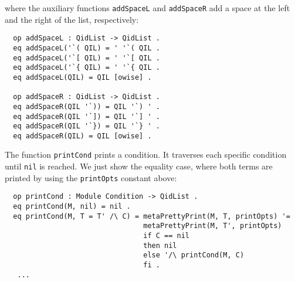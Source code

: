 \noindent
where the auxiliary functions \verb"addSpaceL" and \verb"addSpaceR"
add a space at the left and the right of the list, respectively:

{\codesize
\begin{verbatim}
  op addSpaceL : QidList -> QidList .
  eq addSpaceL('`( QIL) = ' '`( QIL .
  eq addSpaceL('`[ QIL) = ' '`[ QIL .
  eq addSpaceL('`{ QIL) = ' '`{ QIL .
  eq addSpaceL(QIL) = QIL [owise] .

  op addSpaceR : QidList -> QidList .
  eq addSpaceR(QIL '`)) = QIL '`) ' .
  eq addSpaceR(QIL '`]) = QIL '`] ' .
  eq addSpaceR(QIL '`}) = QIL '`} ' .
  eq addSpaceR(QIL) = QIL [owise] .
\end{verbatim}
}

The function \verb"printCond" prints a condition. It traverses each
specific condition until \verb"nil" is reached. We just show the
equality case, where both terms are printed by using the
\texttt{printOpts} constant above:

{\codesize
\begin{verbatim}
  op printCond : Module Condition -> QidList .
  eq printCond(M, nil) = nil .
  eq printCond(M, T = T' /\ C) = metaPrettyPrint(M, T, printOpts) '=
                                 metaPrettyPrint(M, T', printOpts)
                                 if C == nil
                                 then nil
                                 else '/\ printCond(M, C)
                                 fi .
   ...
\end{verbatim}
}

